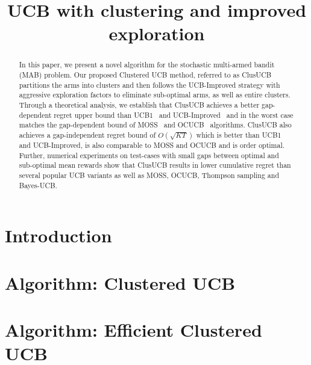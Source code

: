 \documentclass{article}
\title{UCB with clustering and improved exploration}
\begin{document}

\maketitle

\begin{abstract}
In this paper, we present a novel algorithm for the stochastic multi-armed bandit (MAB) problem. Our proposed Clustered UCB method, referred to as ClusUCB partitions the arms into clusters and then follows the UCB-Improved strategy with aggressive exploration factors to eliminate sub-optimal arms, as well as entire clusters. Through a theoretical analysis, we establish that ClusUCB achieves a better gap-dependent regret upper bound than UCB1~\citep{auer2002finite} and UCB-Improved~\citep{auer2010ucb} and in the worst case matches the gap-dependent bound of MOSS~\citep{audibert2009minimax} and OCUCB~\citep{lattimore2015optimally}  algorithms. ClusUCB also achieves a gap-independent regret bound of $O\left(\sqrt{KT}\right)$ which is better than UCB1 and UCB-Improved, is also comparable to MOSS and OCUCB and is order optimal. Further, numerical experiments on test-cases with small gaps between optimal and sub-optimal mean rewards show that ClusUCB results in lower cumulative regret than several popular UCB variants as well as MOSS, OCUCB, Thompson sampling and Bayes-UCB. 

\end{abstract}

\section{Introduction}
\label{sec:intro}


\section{Algorithm: Clustered UCB}
\label{sec:clusucb}


\section{Algorithm: Efficient Clustered UCB}
\label{sec:eclusucb}

\end{document}
